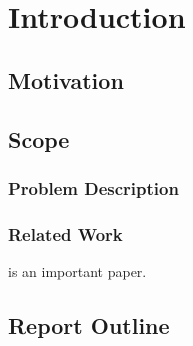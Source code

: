 \section{Introduction}

\subsection{Motivation}

\subsection{Scope}
\subsubsection{Problem Description}
\subsubsection{Related Work}
\cite{schulman_proximal_2017} is an important paper. 
\subsection{Report Outline}

\nocite{schulman_proximal_2017}  %

